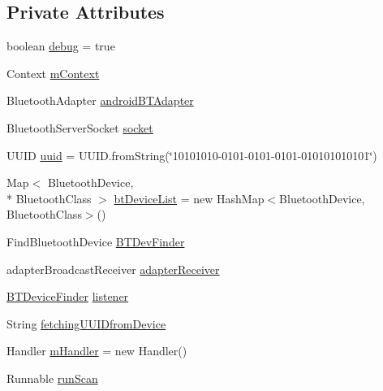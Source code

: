 \subsection*{Private Attributes}
\begin{DoxyCompactItemize}
\item 
boolean \hyperlink{classcs_1_1nsense_1_1bluetooth_1_1_b_t_manager_a1ca2bd8b9421df0d4b4e706c184c1a2c}{debug} = true
\item 
Context \hyperlink{classcs_1_1nsense_1_1bluetooth_1_1_b_t_manager_a16aad7e01045fb3b9fc6ba0e7115daa2}{m\-Context}
\item 
Bluetooth\-Adapter \hyperlink{classcs_1_1nsense_1_1bluetooth_1_1_b_t_manager_ae7d5108ed76162adaca84d5baad628a2}{android\-B\-T\-Adapter}
\item 
Bluetooth\-Server\-Socket \hyperlink{classcs_1_1nsense_1_1bluetooth_1_1_b_t_manager_a8d41fad664a009d3561fd44ec0ce4b20}{socket}
\item 
U\-U\-I\-D \hyperlink{classcs_1_1nsense_1_1bluetooth_1_1_b_t_manager_a818226909573656acd53ca0a64992d01}{uuid} = U\-U\-I\-D.\-from\-String(\char`\"{}10101010-\/0101-\/0101-\/0101-\/010101010101\char`\"{})
\item 
Map$<$ Bluetooth\-Device, \\*
Bluetooth\-Class $>$ \hyperlink{classcs_1_1nsense_1_1bluetooth_1_1_b_t_manager_afc03906b5d9d0e6fe8a946c45abd4eef}{bt\-Device\-List} = new Hash\-Map$<$Bluetooth\-Device, Bluetooth\-Class$>$()
\item 
Find\-Bluetooth\-Device \hyperlink{classcs_1_1nsense_1_1bluetooth_1_1_b_t_manager_a35ae917d1d239f3c98291cc9859a3d31}{B\-T\-Dev\-Finder}
\item 
adapter\-Broadcast\-Receiver \hyperlink{classcs_1_1nsense_1_1bluetooth_1_1_b_t_manager_a58457a44485f8a07e52621a0e5c1c1c5}{adapter\-Receiver}
\item 
\hyperlink{interfacecs_1_1nsense_1_1bluetooth_1_1_b_t_device_finder}{B\-T\-Device\-Finder} \hyperlink{classcs_1_1nsense_1_1bluetooth_1_1_b_t_manager_a5467e47729aa7de424544adaa3a89235}{listener}
\item 
String \hyperlink{classcs_1_1nsense_1_1bluetooth_1_1_b_t_manager_a2cc473579a3d125f798a8e48b13adbf6}{fetching\-U\-U\-I\-Dfrom\-Device}
\item 
Handler \hyperlink{classcs_1_1nsense_1_1bluetooth_1_1_b_t_manager_a263dface8630bc473a0df38eecca70da}{m\-Handler} = new Handler()
\item 
Runnable \hyperlink{classcs_1_1nsense_1_1bluetooth_1_1_b_t_manager_a3268dadae9d20d70f91c47f762e9e8f9}{run\-Scan}
\end{DoxyCompactItemize}
